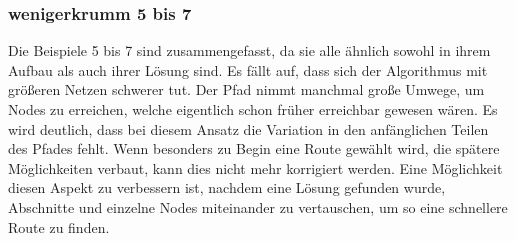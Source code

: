 \documentclass[a4paper,10pt,ngerman]{scrartcl}
\begin{document}
    \subsubsection{wenigerkrumm 5 bis 7}
        Die Beispiele 5 bis 7 sind zusammengefasst, da sie alle ähnlich sowohl in ihrem Aufbau als auch ihrer Lösung sind. Es fällt auf, dass sich der Algorithmus mit größeren Netzen schwerer tut. Der Pfad nimmt manchmal große Umwege, um Nodes zu erreichen, welche eigentlich schon früher erreichbar gewesen wären. Es wird deutlich, dass bei diesem Ansatz die Variation in den anfänglichen Teilen des Pfades fehlt. Wenn besonders zu Begin eine Route gewählt wird, die spätere Möglichkeiten verbaut, kann dies nicht mehr korrigiert werden. Eine Möglichkeit diesen Aspekt zu verbessern ist, nachdem eine Lösung gefunden wurde, Abschnitte und einzelne Nodes miteinander zu vertauschen, um so eine schnellere Route zu finden.\\
\end{document}
